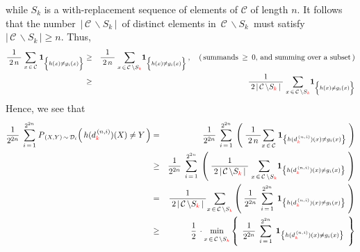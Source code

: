 while $S_{k}$ is a with-replacement sequence of elements of $\mathcal{C}$ of length
$n$. It follows that the number \,$\vert\,\mathcal{C}\,\backslash S_{k}\,\vert$\,
of distinct elements in \,$\mathcal{C}\,\backslash S_{k}$\, must satisfy
\,$\vert\,\mathcal{C}\,\backslash S_{k}\,\vert \geq n$.
Thus,
\begin{eqnarray*}
\dfrac{1}{{\color{white}.}2\,n{\color{white}.}}\;
\underset{x\,\in\,\mathcal{C}}{\sum}\;
\mathbf{1}_{\left\{h(x) \overset{{\color{white}.}}{\neq} g_{i}(x)\right\}}
& \geq &
	\dfrac{1}{{\color{white}.}2\,n{\color{white}.}}\;
	\underset{x\,\in\,\mathcal{C}\,\backslash S_{{\color{red}k}}}{\sum}
	\mathbf{1}_{\left\{h(x) \overset{{\color{white}.}}{\neq} g_{i}(x)\right\}}\,,
	\quad
	\textnormal{(\,summands \,$\geq$\, $0$, and summing over a subset\,)}
\\
& \geq &
	\dfrac{1}{{\color{white}.}2\,\vert\,\mathcal{C}\,\backslash S_{{\color{red}k}}\,\vert{\color{white}.}}\;
	\underset{x\,\in\,\mathcal{C}\,\backslash S_{{\color{red}k}}}{\sum}
	\mathbf{1}_{\left\{h(x) \overset{{\color{white}.}}{\neq} g_{i}(x)\right\}}
\end{eqnarray*}
Hence, we see that
\begin{eqnarray*}
\dfrac{1}{2^{2n}}\;\,
\overset{2^{2n}}{\underset{i\,=\,1}{\sum}}\;
P_{\,(X,Y)\,\sim\,\mathcal{D}_{i}}\!\left(\,h(d^{\,(n,i)}_{{\color{red}k}})(X) \overset{{\color{white}.}}{\neq} Y\,\right)
& = &
	\dfrac{1}{2^{2n}}\;\,
	\overset{2^{2n}}{\underset{i\,=\,1}{\sum}}\;
	\left(\;
		\dfrac{1}{{\color{white}.}2\,n{\color{white}.}}
		\underset{x\,\in\,\mathcal{C}}{\sum}\; \mathbf{1}_{\left\{h(d^{\,(n,i)}_{{\color{red}k}})(x) \neq g_{i}(x)\right\}}
		\;\right)
\\
& \geq &
	\dfrac{1}{2^{2n}}\;\,
	\overset{2^{2n}}{\underset{i\,=\,1}{\sum}}\;
	\left(\;
		\dfrac{1}{{\color{white}.}2\,\vert\,\mathcal{C}\,\backslash S_{{\color{red}k}}\,\vert{\color{white}.}}\;
		\underset{x\,\in\,\mathcal{C}\,\backslash S_{{\color{red}k}}}{\sum}
		\mathbf{1}_{\left\{h(d^{\,(n,i)}_{{\color{red}k}})(x) \neq g_{i}(x)\right\}}
		\;\right)
\\
& = &
	\dfrac{1}{{\color{white}.}2\,\vert\,\mathcal{C}\,\backslash S_{{\color{red}k}}\,\vert{\color{white}.}}
	\underset{x\,\in\,\mathcal{C}\,\backslash S_{{\color{red}k}}}{\sum}
	\left(\;
		\dfrac{1}{2^{2n}}\;\,
		\overset{2^{2n}}{\underset{i\,=\,1}{\sum}}\;\,
		\mathbf{1}_{\left\{h(d^{\,(n,i)}_{{\color{red}k}})(x) \neq g_{i}(x)\right\}}
		\;\right)
\\
& \geq &
	\dfrac{1}{2}\,\cdot
	\underset{x\,\overset{{\color{white}.}}{\in}\,\mathcal{C}\,\backslash S_{{\color{red}k}}}{\min}
	\left\{\;\,
		\dfrac{1}{2^{2n}}\;\,
		\overset{2^{2n}}{\underset{i\,=\,1}{\sum}}\;\,
		\mathbf{1}_{\left\{h(d^{\,(n,i)}_{{\color{red}k}})(x) \neq g_{i}(x)\right\}}
		\,\;\right\}
\end{eqnarray*}
